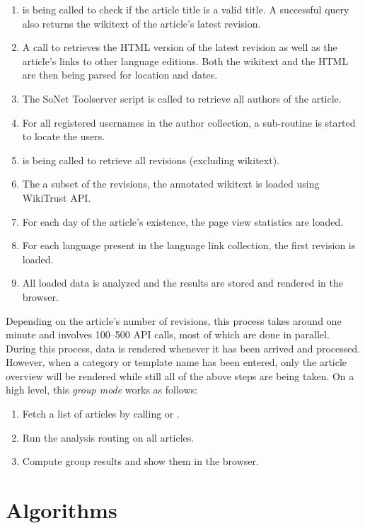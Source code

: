 \begin{enumerate}
	\item {} is being called to check if the article title is a valid title. 
	A successful query also returns the wikitext of the article's latest revision.
	\item A call to  retrieves the \ac{HTML} version of the latest revision as well as the article's links to other language editions. 
	Both the wikitext and the \ac{HTML} are then being parsed for location and dates.
	\item The SoNet Toolserver script is called to retrieve all authors of the article.
	\item For all registered usernames in the author collection, a sub-routine is started to locate the users. 
	\item {} is being called to retrieve all revisions (excluding wikitext). 
	\item The a subset of the revisions, the annotated wikitext is loaded using WikiTrust \ac{API}.
	\item For each day of the article's existence, the page view statistics are loaded.
	\item For each language present in the language link collection, the first revision is loaded.
	\item All loaded data is analyzed and the results are stored and rendered in the browser.
\end{enumerate}

Depending on the article's number of revisions, this process takes around one minute and involves 100--500 \ac{API} calls, most of which are done in parallel. 
During this process, data is rendered whenever it has been arrived and processed.
However, when a category or template name has been entered, only the article overview will be rendered while still all of the above steps are being taken.
On a high level, this \emph{group mode} works as follows:

\begin{enumerate}
    \item Fetch a list of articles by calling  or .
    \item Run the analysis routing on all articles.
    \item Compute group results and show them in the browser.
\end{enumerate}


\section{Algorithms}\label{sec:algorithms}

